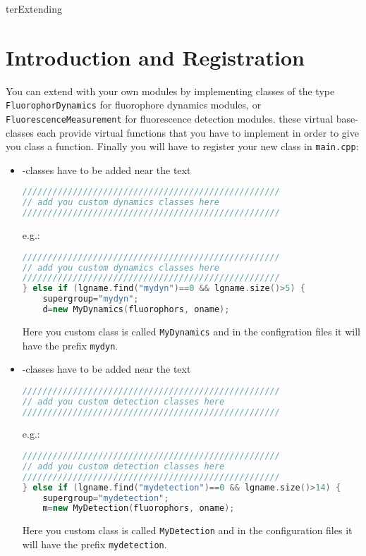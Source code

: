 ter{Extending \df}
\label{sec:ExtendingDf}
\section{Introduction and Registration}
\label{sec:IntroductionAndRegistration}

You can extend \df with your own modules by implementing classes of the type \texttt{FluorophorDynamics} for fluorophore dynamics modules, or \texttt{FluorescenceMeasurement} for fluorescence detection modules. these virtual base-classes each provide virtual functions that you have to implement in order to give you class a function. Finally you will have to register your new class in \texttt{main.cpp}:
\begin{itemize}
	\item {}-classes have to be added near the text
		\begin{lstlisting}[language=c++] 
///////////////////////////////////////////////////
// add you custom dynamics classes here
///////////////////////////////////////////////////
		\end{lstlisting}	
		e.g.:
		\begin{lstlisting}[language=c++] 
///////////////////////////////////////////////////
// add you custom dynamics classes here
///////////////////////////////////////////////////
} else if (lgname.find("mydyn")==0 && lgname.size()>5) {
	supergroup="mydyn";
	d=new MyDynamics(fluorophors, oname);
		\end{lstlisting}	
		Here you custom class is called \texttt{MyDynamics} and in the configration files it will have the prefix \texttt{mydyn}.
	\item {}-classes have to be added near the text
		\begin{lstlisting}[language=c++] 
///////////////////////////////////////////////////
// add you custom detection classes here
///////////////////////////////////////////////////
		\end{lstlisting}	
		e.g.:
		\begin{lstlisting}[language=c++] 
///////////////////////////////////////////////////
// add you custom detection classes here
///////////////////////////////////////////////////
} else if (lgname.find("mydetection")==0 && lgname.size()>14) {
	supergroup="mydetection";
	m=new MyDetection(fluorophors, oname);
		\end{lstlisting}	
		Here you custom class is called \texttt{MyDetection} and in the configuration files it will have the prefix \texttt{mydetection}.
		
\end{itemize}

